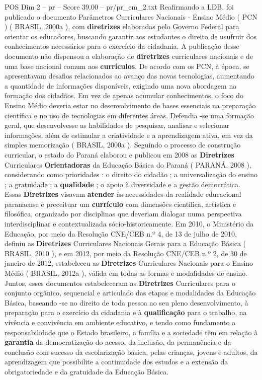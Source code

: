 \begin{textsample}{POS Dim 2 – pr – Score 39.00 – pr/pr\_em\_2.txt}
Reafirmando a LDB, foi publicado o documento Parâmetros Curriculares Nacionais - Ensino Médio ( PCN ) ( BRASIL, 2000a ), com \textbf{diretrizes} elaboradas pelo Governo Federal para orientar os educadores, buscando garantir aos estudantes o direito de usufruir dos conhecimentos necessários para o exercício da cidadania.
A publicação desse documento não dispensou a elaboração de \textbf{diretrizes} curriculares nacionais e de uma base nacional comum aos \textbf{currículos}.
De acordo com os PCN, à época, se apresentavam desafios relacionados ao avanço das novas tecnologias, aumentando a quantidade de informações disponíveis, exigindo uma nova abordagem na formação dos cidadãos.
Em vez de apenas acumular conhecimentos, o foco do Ensino Médio deveria estar no desenvolvimento de bases essenciais na preparação científica e no uso de tecnologias em diferentes áreas.
Defendia -se uma formação geral, que desenvolvesse as habilidades de pesquisar, analisar e selecionar informações, além de estimular a criatividade e a aprendizagem ativa, em vez da simples memorização ( BRASIL, 2000a ).
Seguindo o processo de construção curricular, o estado do Paraná elaborou e publicou em 2008 as \textbf{Diretrizes} Curriculares \textbf{Orientadoras} da Educação Básica do Paraná ( PARANÁ, 2008 ), considerando como prioridades : o direito do cidadão ; a universalização do ensino ; a gratuidade ; a \textbf{qualidade} ; o apoio à diversidade e a gestão democrática.
Essas \textbf{Diretrizes} visavam \textbf{atender} às necessidades da realidade educacional paranaense e preceituar um \textbf{currículo} com dimensões científica, artística e filosófica, organizado por disciplinas que deveriam dialogar numa perspectiva interdisciplinar e contextualizada sócio-historicamente.
Em 2010, o Ministério da Educação, por meio da Resolução CNE/CEB n.º 4, de 13 de julho de 2010, definiu as \textbf{Diretrizes} Curriculares Nacionais Gerais para a Educação Básica ( BRASIL, 2010 ), e em 2012, por meio da Resolução CNE/CEB n.º 2, de 30 de janeiro de 2012, estabeleceu as \textbf{Diretrizes} Curriculares Nacionais para o Ensino Médio ( BRASIL, 2012a ), válida em todas as formas e modalidades de ensino.
Juntos, esses documentos estabeleceram as \textbf{Diretrizes} Curriculares para o conjunto orgânico, sequencial e articulado das etapas e modalidades da Educação Básica, baseando -se no direito de toda pessoa ao seu pleno desenvolvimento, à preparação para o exercício da cidadania e à \textbf{qualificação} para o trabalho, na vivência e convivência em ambiente educativo, e tendo como fundamento a responsabilidade que o Estado brasileiro, a família e a sociedade têm em relação à \textbf{garantia} da democratização do acesso, da inclusão, da permanência e da conclusão com sucesso da escolarização básica, pelas crianças, jovens e adultos, da aprendizagem que possibilite a continuidade dos estudos e a extensão da obrigatoriedade e da gratuidade da Educação Básica.

\end{textsample}
